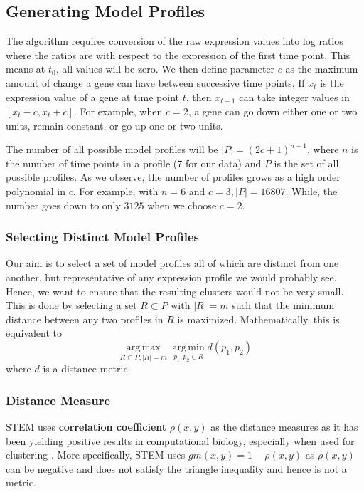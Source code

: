 \subsection{Generating Model Profiles}
The algorithm requires conversion of the raw expression values into log ratios where the ratios are with respect to the expression of the first time point. This means at $t_0$, all values will be zero. We then define parameter $c$ as the maximum amount of change a gene can have between successive time points. If $x_t$ is the expression value of a gene at time point $t$, then $x_{t+1}$ can take integer values in $[x_t -c, x_t+c]$. For example, when $c=2$, a gene can go down either one or two units, remain constant, or go up one or two units. 

The number of all possible model profiles will be $|P| = (2c+1)^{n-1}$, where $n$ is the number of time points in a profile ($7$ for our data) and $P$ is the set of all possible profiles. As we observe, the number of profiles grows as a high order polynomial in $c$. For example, with $n=6$ and $c=3, |P| = 16807$. While, the number goes down to only $3125$ when we choose $c=2$. 

\subsubsection{Selecting Distinct Model Profiles}
Our aim is to select a set of model profiles all of which are distinct from one another, but representative of any expression profile we would probably see. Hence, we want to ensure that the resulting clusters would not be very small. This is done by selecting a set $R \subset P$ with $|R|=m$ such that the minimum distance between any two profiles in $R$ is maximized. Mathematically, this is equivalent to 
\begin{equation} \label{eq:1}
\operatorname*{arg\,max}_{R \subset P, |R|=m} \operatorname*{arg\, min}_{p_1,p_2 \in R} d(p_1,p_2)
\end{equation} where $d$ is a distance metric.

\subsubsection{Distance Measure}
STEM uses \textbf{correlation coefficient} $\rho(x,y)$ as the distance measures as it has been yielding positive results in computational biology, especially when used for clustering \cite{Eisen14863}. More specifically, STEM uses $gm(x,y) = 1- \rho (x,y)$ as $\rho(x,y)$ can be negative and does not satisfy the triangle inequality and hence is not a metric.

